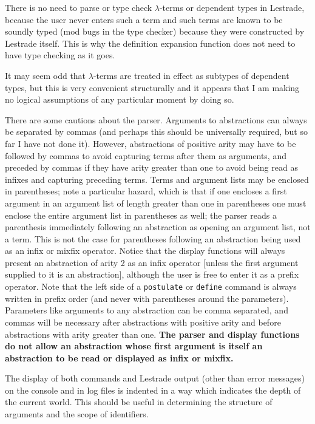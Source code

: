 There is no need to parse or type check $\lambda$-terms or dependent types in Lestrade, because the user never enters such a term and such terms are known to be soundly typed (mod bugs in the type checker) because they were constructed by Lestrade itself.   This is why the definition expansion function does not need to have type
checking as it goes.

It may seem odd that $\lambda$-terms are treated in effect as subtypes of dependent types, but this is very convenient structurally and it appears that I am making no logical assumptions of any particular moment by doing so.

There are some cautions about the parser.   Arguments to abstractions can always be separated by commas (and perhaps this should be universally required, but so far I have not done it).  However, abstractions of positive arity  may have to be followed by commas to avoid capturing terms after them as arguments, and preceded by commas if they have arity greater than one to avoid being read as infixes and capturing preceding terms.   Terms and argument lists may be enclosed in parentheses; note a particular hazard, which is that if one encloses a first argument in an argument list of length greater than one in parentheses one must enclose the entire argument list in parentheses as well; the parser reads a parenthesis immediately following an 
abstraction as opening an argument list, not a term.   This is not the case for parentheses following an abstraction being used as an infix or mixfix operator.  Notice that the display functions will always present an abstraction of arity 2 as an infix operator [unless the first argument supplied to it is an abstraction], although the user is free to enter it as a prefix operator.  Note that the left side of a {\tt postulate} or {\tt define} command is always written in prefix order (and never with parentheses around the parameters).   Parameters like arguments to any abstraction can be comma separated, and commas will be necessary after abstractions with positive arity and before abstractions with arity greater than one.    {\bf The parser and display functions do not allow an abstraction whose first argument is itself an abstraction to be read or displayed as infix or mixfix.}

The display of both commands and Lestrade output (other than error messages) on the console and in log files is indented in a way which indicates the depth of the current world.   This should be useful in determining the structure of arguments and the scope of identifiers.

